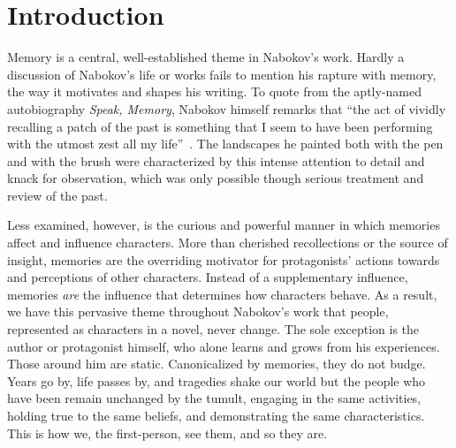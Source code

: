 \section{Introduction}
\label{intro}

Memory is a central, well-established theme in Nabokov's work. 
Hardly a discussion of Nabokov's life or works fails to mention his rapture with memory, the way it motivates and shapes his writing. %
To quote from the aptly-named autobiography \emph{Speak, Memory}, Nabokov himself remarks that ``the act of vividly recalling a patch of the past is something that I seem to have been performing with the utmost zest all my life''~\cite{speakmemory}.
The landscapes he painted both with the pen and with the brush were characterized by this intense attention to detail and knack for observation, which was only possible though serious treatment and review of the past.

Less examined, however, is the curious and powerful manner in which memories affect and influence characters.
More than cherished recollections or the source of insight, memories are the overriding motivator for protagonists' actions towards and perceptions of other characters.
Instead of a supplementary influence, memories \emph{are} the influence that determines how characters behave.
As a result, we have this pervasive theme throughout Nabokov's work that people, represented as characters in a novel, never change. 
The sole exception is the author or protagonist himself, who alone learns and grows from his experiences.
Those around him are static.
Canonicalized by memories, they do not budge.
Years go by, life passes by, and tragedies shake our world but the people who have been remain unchanged by the tumult, engaging in the same activities, holding true to the same beliefs, and demonstrating the same characteristics.
This is how we, the first-person, see them, and so they are.

